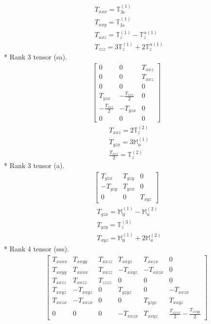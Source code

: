 \documentclass[fleqn,8pt,landscape]{jsarticle}
\begin{document}
\begin{align*}
& T_{xxx} = \mathbb{T}_{3c}^{(1)} \\
& T_{xxy} = \mathbb{T}_{3s}^{(1)} \\
& T_{xxz} = \mathbb{T}_{z}^{(1)} - \mathbb{T}_{z}^{\alpha(1)} \\
& T_{zzz} = 3 \mathbb{T}_{z}^{(1)} + 2 \mathbb{T}_{z}^{\alpha(1)}
\end{align*}
* Rank 3 tensor (sa).
\begin{align*}
\begin{bmatrix} 0 & 0 & T_{xxz} \\ 0 & 0 & T_{xxz} \\ 0 & 0 & 0 \\ T_{yzx} & - \frac{T_{xxz}}{2} & 0 \\ - \frac{T_{xxz}}{2} & - T_{yzx} & 0 \\ 0 & 0 & 0 \end{bmatrix}
\end{align*}
\begin{align*}
& T_{xxz} = 2 \mathbb{T}_{z}^{(2)} \\
& T_{yzx} = 3 \mathbb{M}_{u}^{(1)} \\
& \frac{T_{xxz}}{2} = \mathbb{T}_{z}^{(2)}
\end{align*}
* Rank 3 tensor (a).
\begin{align*}
\begin{bmatrix} T_{yzx} & T_{yzy} & 0 \\ - T_{yzy} & T_{yzx} & 0 \\ 0 & 0 & T_{xyz} \end{bmatrix}
\end{align*}
\begin{align*}
& T_{yzx} = \mathbb{M}_{0}^{(1)} - \mathbb{M}_{u}^{(2)} \\
& T_{yzy} = \mathbb{T}_{z}^{(3)} \\
& T_{xyz} = \mathbb{M}_{0}^{(1)} + 2 \mathbb{M}_{u}^{(2)}
\end{align*}
* Rank 4 tensor (sss).
\begin{align*}
\begin{bmatrix} T_{xxxx} & T_{xxyy} & T_{xxzz} & T_{xxyz} & T_{xxzx} & 0 \\ T_{xxyy} & T_{xxxx} & T_{xxzz} & - T_{xxyz} & - T_{xxzx} & 0 \\ T_{xxzz} & T_{xxzz} & T_{zzzz} & 0 & 0 & 0 \\ T_{xxyz} & - T_{xxyz} & 0 & T_{yzyz} & 0 & - T_{xxzx} \\ T_{xxzx} & - T_{xxzx} & 0 & 0 & T_{yzyz} & T_{xxyz} \\ 0 & 0 & 0 & - T_{xxzx} & T_{xxyz} & \frac{T_{xxxx}}{2} - \frac{T_{xxyy}}{2} \end{bmatrix}
\end{align*}
\end{document}
